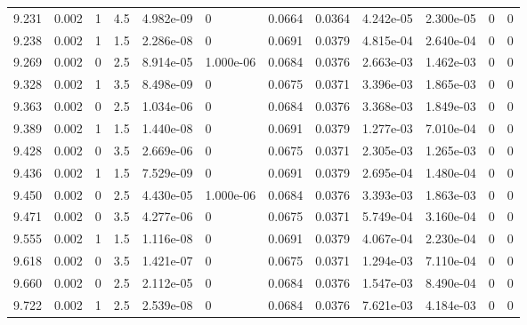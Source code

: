 \documentclass[preview]{standalone}
\begin{document}
{{{\begin{tabular}{L{1.2cm}C{1.2cm} C{0.3cm}C{0.5cm} C{1.4cm}C{1.4cm} C{1.4cm}C{1.4cm} C{1.6cm}C{1.6cm} C{1.6cm}C{1.6cm}}
  9.231  &  0.002  & 1     & 4.5 &  4.982e-09  & 0  &  0.0664&   0.0364& 4.242e-05 & 2.300e-05   &  0 & 0  \\ 
  9.238  &  0.002  & 1     & 1.5 &  2.286e-08  & 0  &  0.0691&   0.0379& 4.815e-04 & 2.640e-04   &  0 & 0  \\ 
  9.269  &  0.002  & 0     & 2.5 &  8.914e-05  & 1.000e-06  &  0.0684&   0.0376& 2.663e-03 & 1.462e-03   &  0 & 0  \\ 
  9.328  &  0.002  & 1     & 3.5 &  8.498e-09  & 0  &  0.0675&   0.0371& 3.396e-03 & 1.865e-03   &  0 & 0  \\ 
  9.363  &  0.002  & 0     & 2.5 &  1.034e-06  & 0  &  0.0684&   0.0376& 3.368e-03 & 1.849e-03   &  0 & 0  \\ 
  9.389  &  0.002  & 1     & 1.5 &  1.440e-08  & 0  &  0.0691&   0.0379& 1.277e-03 & 7.010e-04   &  0 & 0  \\ 
  9.428  &  0.002  & 0     & 3.5 &  2.669e-06  & 0  &  0.0675&   0.0371& 2.305e-03 & 1.265e-03   &  0 & 0  \\ 
  9.436  &  0.002  & 1     & 1.5 &  7.529e-09  & 0  &  0.0691&   0.0379& 2.695e-04 & 1.480e-04   &  0 & 0  \\ 
  9.450  &  0.002  & 0     & 2.5 &  4.430e-05  & 1.000e-06  &  0.0684&   0.0376& 3.393e-03 & 1.863e-03   &  0 & 0  \\ 
  9.471  &  0.002  & 0     & 3.5 &  4.277e-06  & 0  &  0.0675&   0.0371& 5.749e-04 & 3.160e-04   &  0 & 0  \\ 
  9.555  &  0.002  & 1     & 1.5 &  1.116e-08  & 0  &  0.0691&   0.0379& 4.067e-04 & 2.230e-04   &  0 & 0  \\ 
  9.618  &  0.002  & 0     & 3.5 &  1.421e-07  & 0  &  0.0675&   0.0371& 1.294e-03 & 7.110e-04   &  0 & 0  \\ 
  9.660  &  0.002  & 0     & 2.5 &  2.112e-05  & 0  &  0.0684&   0.0376& 1.547e-03 & 8.490e-04   &  0 & 0  \\ 
  9.722  &  0.002  & 1     & 2.5 &  2.539e-08  & 0  &  0.0684&   0.0376& 7.621e-03 & 4.184e-03   &  0 & 0  \\ 
\hline 
\end{tabular} 

}}}
\end{document}
